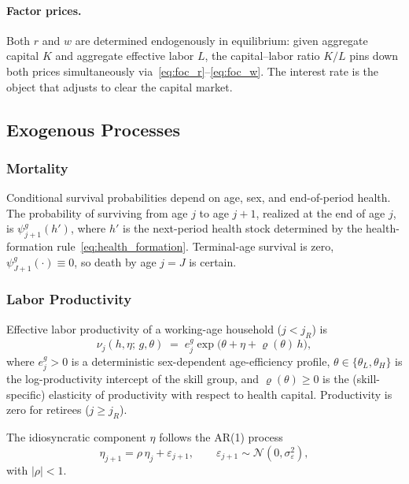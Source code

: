 \documentclass[12pt,a4paper]{article}
\begin{document}
\paragraph{Factor prices.}
Both $r$ and $w$ are determined endogenously in equilibrium: given aggregate capital $K$ and aggregate effective labor $L$, the capital--labor ratio $K/L$ pins down both prices simultaneously via~\eqref{eq:foc_r}--\eqref{eq:foc_w}. The interest rate is the object that adjusts to clear the capital market.


\subsection{Exogenous Processes}
\label{subsec:exogenous}

\subsubsection{Mortality}
\label{subsubsec:mortality}

Conditional survival probabilities depend on age, sex, and end-of-period health. The probability of surviving from age $j$ to age $j+1$, realized at the end of age $j$, is $\psi_{j+1}^{g}(h')$, where $h'$ is the next-period health stock determined by the health-formation rule~\eqref{eq:health_formation}. Terminal-age survival is zero, $\psi_{J+1}^{g}(\cdot) \equiv 0$, so death by age $j = J$ is certain.

\subsubsection{Labor Productivity}
\label{subsubsec:productivity}

Effective labor productivity of a working-age household ($j < j_R$) is
\begin{equation}
\label{eq:labor_productivity}
\nu_j(h, \eta;\, g,\theta) \;=\; e_{j}^{g} \exp\bigl(\theta + \eta + \varrho(\theta)\, h\bigr),
\end{equation}
where $e_{j}^{g} > 0$ is a deterministic sex-dependent age-efficiency profile, $\theta \in \{\theta_L, \theta_H\}$ is the log-productivity intercept of the skill group, and $\varrho(\theta) \geq 0$ is the (skill-specific) elasticity of productivity with respect to health capital. Productivity is zero for retirees ($j \geq j_R$).

The idiosyncratic component $\eta$ follows the AR(1) process
\begin{equation}
\label{eq:ar1}
\eta_{j+1} = \rho\, \eta_j + \varepsilon_{j+1}, \qquad \varepsilon_{j+1} \sim \mathcal{N}(0, \sigma_\varepsilon^2),
\end{equation}
with $|\rho| < 1$. 
\end{document}
